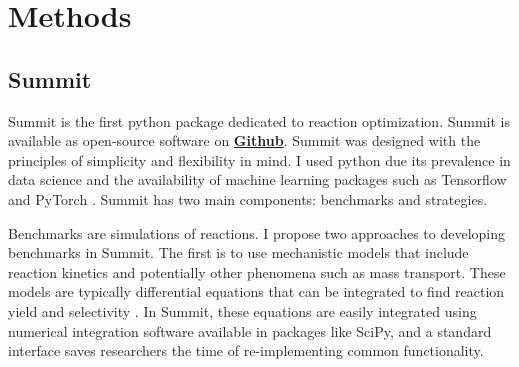 

\section{Methods}

\subsection{Summit}
Summit is the first python package dedicated to reaction optimization. Summit is available as open-source software on \textbf{\href{https://github.com/sustainable-processes/summit}{Github}}.  Summit was designed with the principles of simplicity and  flexibility in mind. I used python due its prevalence in data science and the availability of machine learning packages such as Tensorflow \cite{tensorflow2015} and PyTorch \cite{Paszke2019}. Summit has two main components: benchmarks and strategies.
    
Benchmarks are simulations of reactions. I propose two approaches to developing benchmarks in Summit. The first is to use mechanistic models that include reaction kinetics and potentially other phenomena such as mass transport. These models are typically differential equations that can be integrated to find reaction yield and selectivity \cite{Reizman2015b, Baumgartner2018}. In Summit, these equations are easily integrated using numerical integration software available in packages like SciPy, \cite{2020SciPy-NMeth} and a standard interface saves researchers the time of re-implementing common functionality. 

